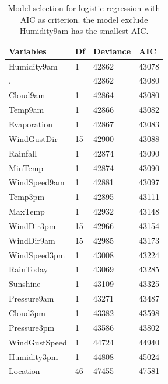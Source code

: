 \documentclass[11pt, a4paper, jou]{apa7}
\begin{document}
    
\begin{table}[p]
    \centering
    \caption{Model selection for logistic regression with AIC as criterion. the model exclude Humidity9am has the smallest AIC. }
    \label{tab:model_selection_aic}
    \begin{tabular}{llll}
        \hline
        Variables     & Df & Deviance & AIC                          \\ \hline
        Humidity9am   & 1  & 42862    & {\color[HTML]{FE0000} 43078} \\
        .             &    & 42862    & 43080                        \\
        Cloud9am      & 1  & 42864    & 43080                        \\
        Temp9am       & 1  & 42866    & 43082                        \\
        Evaporation   & 1  & 42867    & 43083                        \\
        WindGustDir   & 15 & 42900    & 43088                        \\
        Rainfall      & 1  & 42874    & 43090                        \\
        MinTemp       & 1  & 42874    & 43090                        \\
        WindSpeed9am  & 1  & 42881    & 43097                        \\
        Temp3pm       & 1  & 42895    & 43111                        \\
        MaxTemp       & 1  & 42932    & 43148                        \\
        WindDir3pm    & 15 & 42966    & 43154                        \\
        WindDir9am    & 15 & 42985    & 43173                        \\
        WindSpeed3pm  & 1  & 43008    & 43224                        \\
        RainToday     & 1  & 43069    & 43285                        \\
        Sunshine      & 1  & 43109    & 43325                        \\
        Pressure9am   & 1  & 43271    & 43487                        \\
        Cloud3pm      & 1  & 43382    & 43598                        \\
        Pressure3pm   & 1  & 43586    & 43802                        \\
        WindGustSpeed & 1  & 44724    & 44940                        \\
        Humidity3pm   & 1  & 44808    & 45024                        \\
        Location      & 46 & 47455    & 47581                        \\ \hline
    \end{tabular}
\end{table}
\end{document}
